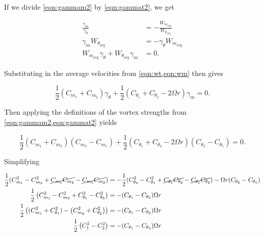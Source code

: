 \noindent If we divide \cref{eqn:gammam2} by \cref{eqn:gammat2}, we get

\begin{equation}
    \label{eqn:wgam}
    \begin{aligned}
        \frac{\gamma_m}{\gamma_\theta} &= -\frac{W_{m_\text{avg}}}{W_{\theta_\text{avg}}} \\
        \gamma_m W_{\theta_\text{avg}} &= -\gamma_\theta W_{m_\text{avg}} \\
        W_{m_\text{avg}} \gamma_\theta + W_{\theta_\text{avg}} \gamma_m &= 0.
    \end{aligned}
\end{equation}

\noindent Substituting in the average velocities from \cref{eqn:wt,eqn:wm} then gives

\begin{equation}
    \frac{1}{2}(C_{m_1} + C_{m_2}) \gamma_\theta + \frac{1}{2} (C_{\theta_1} + C_{\theta_2} - 2\Omega r)  \gamma_m = 0.
\end{equation}

\noindent Then applying the definitions of the vortex strengths from \cref{eqn:gammam2,eqn:gammat2} yields

\begin{equation}
    \frac{1}{2}(C_{m_1} + C_{m_2}) (C_{m_2} - C_{m_1})  + \frac{1}{2} (C_{\theta_1} + C_{\theta_2} - 2\Omega r)  (C_{\theta_2} - C_{\theta_1}) = 0.
\end{equation}

\noindent Simplifying

\begin{equation}
    \begin{aligned}
        \frac{1}{2}(C_{m_1}^2 - C_{m_2}^2 +\cancel{C_{m_1}C_{m_2}}-\cancel{C_{m_1}C_{m_2}}) &= -\frac{1}{2} (C_{\theta_2}^2 - C_{\theta_1}^2 +\cancel{C_{\theta_1}C_{\theta_2}}-\cancel{C_{\theta_1}C_{\theta_2}}) - \Omega r(C_{\theta_2} - C_{\theta_1}) \\
        \frac{1}{2} \left(C_{m_1}^2 - C_{m_2}^2 + C_{\theta_1}^2 - C_{\theta_2}^2 \right) &= -(C_{\theta_1} - C_{\theta_2}) \Omega r \\
        \frac{1}{2} \left((C_{m_1}^2 + C_{\theta_1}^2) - \left(C_{m_2}^2 + C_{\theta_2}^2 \right)  \right) &= - (C_{\theta_1} - C_{\theta_2}) \Omega r \\
        \frac{1}{2} \left(C_{1}^2 - C_{2}^2 \right) &= -(C_{\theta_1} - C_{\theta_2}) \Omega r
    \end{aligned}
\end{equation}


